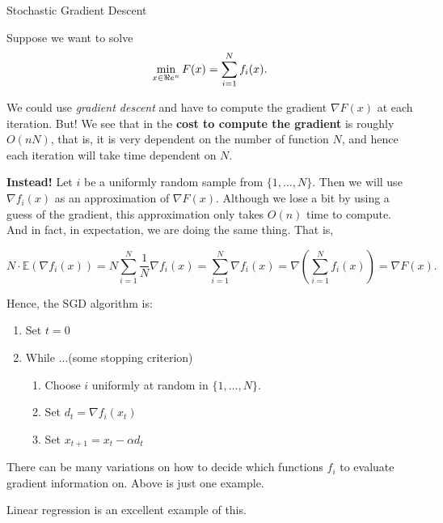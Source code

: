\begin{general}{Stochastic Gradient Descent}{}

Suppose we want to solve
\begin{equation}
\min_{x \in \Re e^n} F(x) = \sum_{i=1}^N f_i(x).
\end{equation}

We could use \emph{gradient descent} and have to compute the gradient $\nabla F(x)$ at each iteration.  But!   We see that in the \textbf{cost to compute the gradient} is roughly $O(nN)$, that is, it is very dependent on the number of function $N$, and hence each iteration will take time dependent on $N$.

\textbf{Instead!} Let $i$ be a uniformly random sample from $\{1, \dots, N\}$.  Then we will use $\nabla f_i(x)$ as an approximation of $\nabla F(x)$.  Although we lose a bit by using a guess of the gradient, this approximation only takes $O(n)$ time to compute.  And in fact, in expectation, we are doing the same thing.  That is,

$$
N\cdot  \mathbb{E}( \nabla f_i(x)) = N \sum_{i=1}^N \frac{1}{N} \nabla f_i(x) =  \sum_{i=1}^N\nabla f_i(x) = \nabla \left(  \sum_{i=1}^N   f_i(x)\right) = \nabla F(x).
$$


Hence, the SGD algorithm is:

\begin{enumerate}
\item Set $t = 0$
\item While ...(some stopping criterion)
\begin{enumerate}
\item Choose $i$ uniformly at random in $\{1, \dots, N\}$.
\item Set $d_t = \nabla f_i(x_t)$
\item Set $x_{t+1} = x_t - \alpha d_t$
\end{enumerate}
\end{enumerate}

There can be many variations on how to decide which functions $f_i$ to evaluate gradient information on.  Above is just one example.

\end{general}
 
 
 
 Linear regression is an excellent example of this.  

